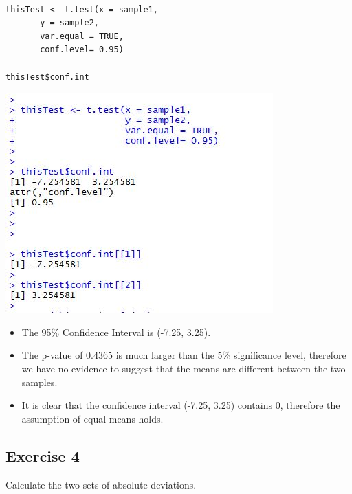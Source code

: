 \documentclass[a4paper,12pt]{article}
\begin{document}
\begin{framed}\begin{verbatim}

thisTest <- t.test(x = sample1, 
       y = sample2, 
       var.equal = TRUE, 
       conf.level= 0.95)

thisTest$conf.int
\end{verbatim}\end{framed}

\includegraphics[scale=1.4]{00-A1/images/A1-Q4-ConfInts.JPG}
\begin{itemize}
    \item The 95\% Confidence Interval is (-7.25, 3.25).

\item The p-value of 0.4365 is much larger than the 5\% significance level, therefore we
have no evidence to suggest that the means are different between the two samples.
 
\item It is clear that the confidence interval (-7.25, 3.25) contains 0, therefore 
the assumption of equal means holds.
\end{itemize}




\newpage 

\subsection*{Exercise 4}

\noindent Calculate the two sets of absolute deviations.\\

		
\end{document}

